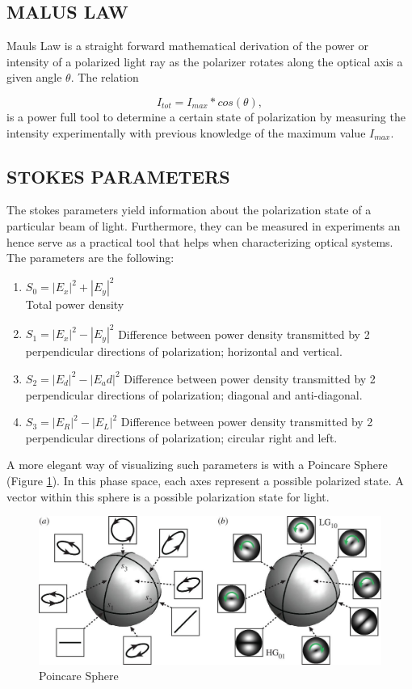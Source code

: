 \subsection{MALUS LAW}
Mauls Law is a straight forward mathematical derivation of the power or intensity of a polarized light ray as the polarizer rotates along the optical axis a given angle $\theta$. The relation

\begin{equation*}
    I_{tot} = I_{max}*cos(\theta),
\end{equation*}
is a power full tool to determine a certain state of polarization by measuring the intensity experimentally with previous knowledge of the maximum value $I_{max}$.

\subsection{STOKES PARAMETERS}
The stokes parameters yield information about the polarization state of a particular beam of light. Furthermore, they can be measured in experiments an hence serve as a practical tool that helps when characterizing optical systems. The parameters are the following: 
\\
\begin{enumerate}
    \item $S_0 = |E_x|^2 + |E_y|^2 $\\
    Total power density
    \item $S_1= |E_x|^2 - |E_y|^2 $ 
    Difference between power density transmitted by 2 perpendicular directions of polarization; horizontal and vertical.
    \item $S_2= |E_d|^2 - |E_ad|^2$ 
    Difference between power density transmitted by 2 perpendicular directions of polarization; diagonal and anti-diagonal.
    \item $S_3= |E_R|^2 - |E_L|^2$ 
    Difference between power density transmitted by 2 perpendicular directions of polarization; circular right and left. 
\end{enumerate}

A more elegant way of visualizing such parameters is with a Poincare Sphere (Figure \ref{fig:Poincare}). In this phase space, each axes represent a possible polarized state. A vector within this sphere is a possible polarization state for light. 
\begin{figure}[H]
    \centering
    \includegraphics[scale=0.70]{Figures/Poincare.jpg}
    \caption{Poincare Sphere \cite{figpoincare}}
    \label{fig:Poincare}
\end{figure}

